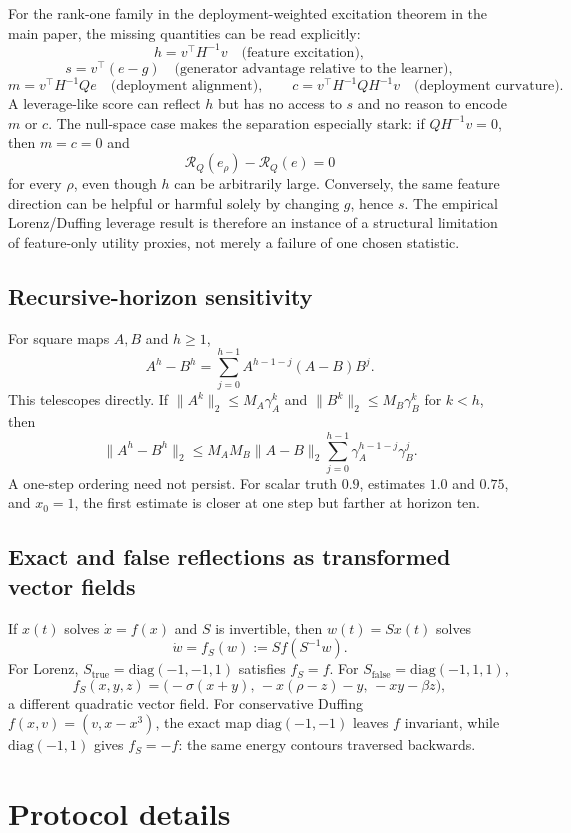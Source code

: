 For the rank-one family in the deployment-weighted excitation theorem in the main paper, the missing quantities can be read explicitly:
\[
h=v^\top H^{-1}v\quad\text{(feature excitation)},
\]
\[
s=v^\top(e-g)\quad\text{(generator advantage relative to the learner)},
\]
\[
m=v^\top H^{-1}Qe\quad\text{(deployment alignment)},
\qquad
c=v^\top H^{-1}QH^{-1}v\quad\text{(deployment curvature)}.
\]
A leverage-like score can reflect $h$ but has no access to $s$ and no reason to encode $m$ or $c$. The null-space case makes the separation especially stark: if $QH^{-1}v=0$, then $m=c=0$ and
\[
\mathcal R_Q(e_\rho)-\mathcal R_Q(e)=0
\]
for every $\rho$, even though $h$ can be arbitrarily large. Conversely, the same feature direction can be helpful or harmful solely by changing $g$, hence $s$. The empirical Lorenz/Duffing leverage result is therefore an instance of a structural limitation of feature-only utility proxies, not merely a failure of one chosen statistic.

\subsection{Recursive-horizon sensitivity}
For square maps $A,B$ and $h\ge1$,
\[
A^h-B^h=\sum_{j=0}^{h-1}A^{h-1-j}(A-B)B^j.
\]
This telescopes directly. If $\|A^k\|_2\le M_A\gamma_A^k$ and $\|B^k\|_2\le M_B\gamma_B^k$ for $k<h$, then
\[
\|A^h-B^h\|_2\le M_AM_B\|A-B\|_2
\sum_{j=0}^{h-1}\gamma_A^{h-1-j}\gamma_B^j.
\]
A one-step ordering need not persist. For scalar truth $0.9$, estimates $1.0$ and $0.75$, and $x_0=1$, the first estimate is closer at one step but farther at horizon ten.

\subsection{Exact and false reflections as transformed vector fields}\label{app:conj}
If $x(t)$ solves $\dot x=f(x)$ and $S$ is invertible, then $w(t)=Sx(t)$ solves
\[
\dot w=f_S(w):=Sf(S^{-1}w).
\]
For Lorenz, $S_{\mathrm{true}}=\mathrm{diag}(-1,-1,1)$ satisfies $f_S=f$. For $S_{\mathrm{false}}=\mathrm{diag}(-1,1,1)$,
\[
f_S(x,y,z)=\big(-\sigma(x+y),\,-x(\rho-z)-y,\,-xy-\beta z\big),
\]
a different quadratic vector field. For conservative Duffing $f(x,v)=(v,x-x^3)$, the exact map $\mathrm{diag}(-1,-1)$ leaves $f$ invariant, while $\mathrm{diag}(-1,1)$ gives $f_S=-f$: the same energy contours traversed backwards.

\section{Protocol details}\label{app:protocol}
